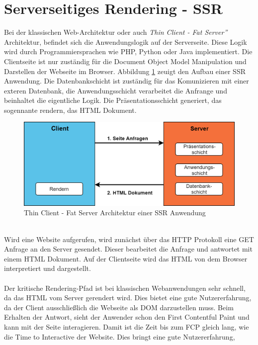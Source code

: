 \documentclass[runningheads]{llncs}
\numberwithin{figure}{section}
\begin{document}
\section{Serverseitiges Rendering - SSR}
\label{sec:Serverseitiges Rendering}
Bei der klassischen Web-Architektur oder auch \textit{Thin Client - Fat Server”} 
Architektur, befindet sich die Anwendungslogik auf der Serverseite. 
Diese Logik wird durch Programmiersprachen wie PHP, Python oder Java 
implementiert. Die Clientseite ist nur zuständig für die Document Object Model 
Manipulation und Darstellen der Webseite im Browser. Abbildung \ref{Thin Client - Fat Server Architektur einer SSR Anwendung} 
zeuigt den Aufbau einer SSR Anwendung. Die Datenbankschicht ist zuständig für das Komunizieren mit einer exteren
Datenbank, die Anwendungsschicht verarbeitet die Anfrange und beinhaltet die eigentliche Logik. Die Präsentationsschicht generiert,
das sogennante rendern, das HTML Dokument. \cite{IsomorphicApps} \cite{subramanian}
\begin{figure}[h]
  \centering
  \includegraphics[width=12cm]{images/server}
  \caption{Thin Client - Fat Server Architektur einer SSR Anwendung}
  \label{Thin Client - Fat Server Architektur einer SSR Anwendung}
\end{figure}
\\
Wird eine Website aufgerufen, wird zunächst über das HTTP Protokoll 
eine GET Anfrage an den Server gesendet. Dieser bearbeitet die Anfrage 
und antwortet mit einem HTML Dokument. Auf der Clientseite wird das HTML 
von dem Browser interpretiert und dargestellt.
\\
\\
Der kritische Rendering-Pfad ist bei klassischen Webanwendungen sehr schnell, 
da das HTML vom Server gerendert wird. Dies bietet eine gute Nutzererfahrung, 
da der Client ausschließlich die Webseite als DOM darzustellen muss. 
Beim Erhalten der Antwort, sieht der Anwender schon den First Contentful Paint 
und kann mit der Seite interagieren. Damit ist die Zeit bis zum FCP gleich lang, 
wie die Time to Interactive der Website. Dies bringt eine gute Nutzererfahrung, 
\end{document}
